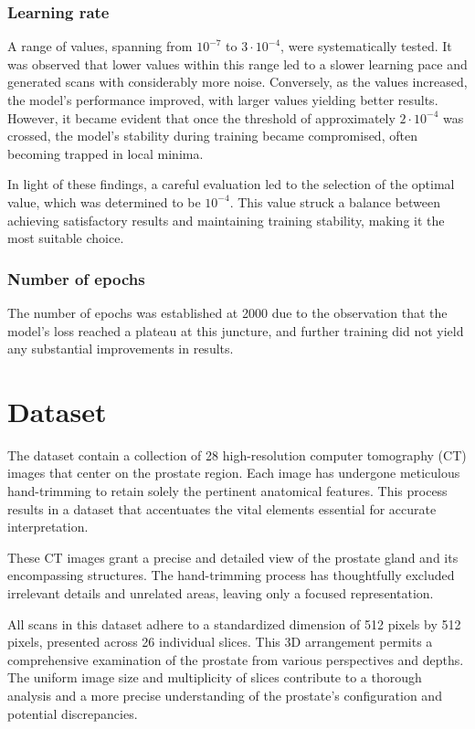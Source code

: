 \documentclass[11pt,a4paper]{report}
\begin{document}
\subsubsection{Learning rate}
A range of values, spanning from $10^{-7}$ to $3\cdot10^{-4}$, were systematically tested. It was observed that lower values within this range led to a slower learning pace and generated scans with considerably more noise. Conversely, as the values increased, the model's performance improved, with larger values yielding better results. However, it became evident that once the threshold of approximately $2\cdot10^{-4}$ was crossed, the model's stability during training became compromised, often becoming trapped in local minima.

In light of these findings, a careful evaluation led to the selection of the optimal value, which was determined to be $10^{-4}$. This value struck a balance between achieving satisfactory results and maintaining training stability, making it the most suitable choice.
\subsubsection{Number of epochs}
The number of epochs was established at 2000 due to the observation that the model's loss reached a plateau at this juncture, and further training did not yield any substantial improvements in results.


\section{Dataset}
The dataset contain a collection of 28 high-resolution computer tomography (CT) images that center on the prostate region. Each image has undergone meticulous hand-trimming to retain solely the pertinent anatomical features. This process results in a dataset that accentuates the vital elements essential for accurate interpretation.

These CT images grant a precise and detailed view of the prostate gland and its encompassing structures. The hand-trimming process has thoughtfully excluded irrelevant details and unrelated areas, leaving only a focused representation.

All scans in this dataset adhere to a standardized dimension of 512 pixels by 512 pixels, presented across 26 individual slices. This 3D arrangement permits a comprehensive examination of the prostate from various perspectives and depths. The uniform image size and multiplicity of slices contribute to a thorough analysis and a more precise understanding of the prostate's configuration and potential discrepancies.
\end{document}
